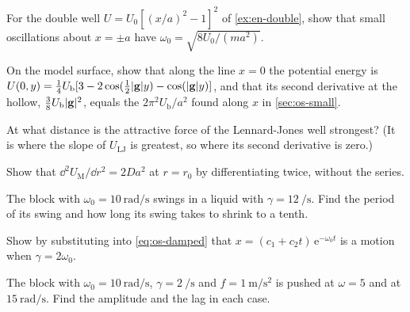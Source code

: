\begin{exercise}
\label{ex:os-double}
For the double well $U = U_0[(x/a)^2 - 1]^2$ of \cref{ex:en-double}, show
that small oscillations about $x = \pm a$ have $\omega_0 = \sqrt{8U_0/(m
a^2)}$.
\end{exercise}

\begin{exercise}
\label{ex:os-isotropic}
On the model surface, show that along the line $x = 0$ the potential
energy is $U(0, y) = \frac14 U_{\mathrm b}[3 - 2\cos(\frac12\lvert\bm{\mathrm{g}}
\rvert y) - \cos(\lvert\bm{\mathrm{g}}\rvert y)]$, and that its second derivative at
the hollow, $\frac38 U_{\mathrm b}\lvert\bm{\mathrm{g}}\rvert^2$, equals the
$2\pi^2U_{\mathrm b}/a^2$ found along $x$ in \cref{sec:os-small}.
\end{exercise}

\begin{exercise}
\label{ex:os-lj}
At what distance is the attractive force of the Lennard-Jones well
strongest? (It is where the slope of $U_{\mathrm{LJ}}$ is greatest, so
where its second derivative is zero.)
\end{exercise}

\begin{exercise}
\label{ex:os-morse}
Show that $\dd^2 U_{\mathrm M}/\dd r^2 = 2Da^2$ at $r = r_0$ by
differentiating twice, without the series.
\end{exercise}

\begin{exercise}
\label{ex:os-liquid}
The block with $\omega_0 = \SI{10}{\radian\per\second}$ swings in a
liquid with $\gamma = \SI{12}{\per\second}$. Find the period of its swing
and how long its swing takes to shrink to a tenth.
\end{exercise}

\begin{exercise}
\label{ex:os-critical}
Show by substituting into \cref{eq:os-damped} that $x = (c_1 + c_2 t)\,
\mathrm{e}^{-\omega_0 t}$ is a motion when $\gamma = 2\omega_0$.
\end{exercise}

\begin{exercise}
\label{ex:os-off}
The block with $\omega_0 = \SI{10}{\radian\per\second}$, $\gamma =
\SI{2}{\per\second}$ and $f = \SI{1}{\metre\per\second\squared}$ is
pushed at $\omega = 5$ and at $\SI{15}{\radian\per\second}$. Find the
amplitude and the lag in each case.
\end{exercise}

